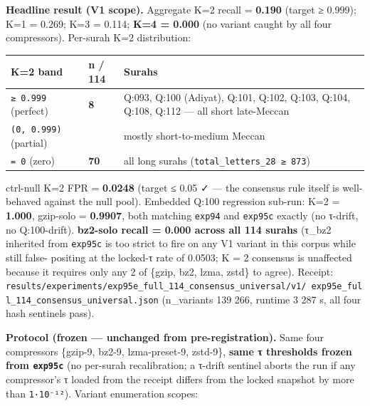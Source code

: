 \documentclass[
]{article}
\newcounter{none} %
\begin{document}
\textbf{Headline result (V1 scope).} Aggregate K=2 recall =
\textbf{0.190} (target ≥ 0.999); K=1 = 0.269; K=3 = 0.114; \textbf{K=4 =
0.000} (no variant caught by all four compressors). Per-surah K=2
distribution:

{\def\LTcaptype{none} %
\begin{longtable}[]{@{}
  >{\raggedright\arraybackslash}p{}
  >{\raggedleft\arraybackslash}p{}
  >{\raggedright\arraybackslash}p{}@{}}
\toprule\noalign{}
\begin{minipage}[b]{\linewidth}\raggedright
K=2 band
\end{minipage} & \begin{minipage}[b]{\linewidth}\raggedleft
n / 114
\end{minipage} & \begin{minipage}[b]{\linewidth}\raggedright
Surahs
\end{minipage} \\
\midrule\noalign{}
\endhead
\bottomrule\noalign{}
\endlastfoot
\texttt{≥\ 0.999} (perfect) & \textbf{8} & Q:093, Q:100 (Adiyat), Q:101,
Q:102, Q:103, Q:104, Q:108, Q:112 --- all short late-Meccan \\
\texttt{(0,\ 0.999)} (partial) & 36 & mostly short-to-medium Meccan \\
\texttt{=\ 0} (zero) & \textbf{70} & all long surahs
(\texttt{total\_letters\_28\ ≥\ 873}) \\
\end{longtable}
}

ctrl-null K=2 FPR = \textbf{0.0248} (target ≤ 0.05 ✓ --- the consensus
rule itself is well-behaved against the null pool). Embedded Q:100
regression sub-run: K=2 = \textbf{1.000}, gzip-solo = \textbf{0.9907},
both matching \texttt{exp94} and \texttt{exp95c} exactly (no τ-drift, no
Q:100-drift). \textbf{bz2-solo recall = 0.000 across all 114 surahs}
(τ\_bz2 inherited from \texttt{exp95c} is too strict to fire on any V1
variant in this corpus while still false- positing at the locked-τ rate
of 0.0503; K = 2 consensus is unaffected because it requires only any 2
of \{gzip, bz2, lzma, zstd\} to agree). Receipt:
\texttt{results/experiments/exp95e\_full\_114\_consensus\_universal/v1/\ exp95e\_full\_114\_consensus\_universal.json}
(n\_variants 139 266, runtime 3 287 s, all four hash sentinels pass).

\textbf{Protocol (frozen --- unchanged from pre-registration).} Same
four compressors \{gzip-9, bz2-9, lzma-preset-9, zstd-9\}, \textbf{same
τ thresholds frozen from \texttt{exp95c}} (no per-surah recalibration; a
τ-drift sentinel aborts the run if any compressor's τ loaded from the
receipt differs from the locked snapshot by more than \texttt{1·10⁻¹²}).
Variant enumeration scopes:
\end{document}
